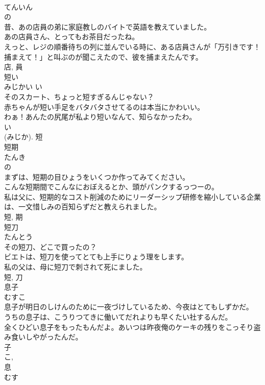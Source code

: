 \documentclass[8pt]{extreport}
\begin{document}
\begin{CJK}{UTF8}{min}
\\	てんいん	
\\	の 
\\	昔、あの店員の弟に家庭教しのバイトで英語を教えていました。	
\\	あの店員さん、とってもお茶目だったね。	
\\	えっと、レジの順番待ちの列に並んでいる時に、ある店員さんが「万引きです！捕まえて！」と叫ぶのが聞こえたので、彼を捕まえたんです。	
\\	店, 員	
\\	短い	
\\	みじかい	い 
\\	そのスカート、ちょっと短すぎるんじゃない？	
\\	赤ちゃんが短い手足をバタバタさせてるのは本当にかわいい。	
\\	わぁ！あんたの尻尾が私より短いなんて、知らなかったわ。	
\\	い 
\\	(みじか).	短	
\\	短期	
\\	たんき	
\\	の 
\\	まずは、短期の目ひょうをいくつか作ってみてください。	
\\	こんな短期間でこんなにおぼえるとか、頭がパンクするっつーの。	
\\	私は父に、短期的なコスト削減のためにリーダーシップ研修を縮小している企業は、一文惜しみの百知らずだと教えられました。	
\\	短, 期	
\\	短刀	
\\	たんとう	
\\	その短刀、どこで買ったの？	
\\	ビエトは、短刀を使ってとても上手にりょう理をします。	
\\	私の父は、母に短刀で刺されて死にました。	
\\	短, 刀	
\\	息子	
\\	むすこ	
\\	息子が明日のしけんのために一夜づけしているため、今夜はとてもしずかだ。	
\\	うちの息子は、こうりつてきに働いてだれよりも早くたい社するんだ。	
\\	全くひどい息子をもったもんだよ。あいつは昨夜俺のケーキの残りをこっそり盗み食いしやがったんだ。	
\\	子 
\\	こ, 
\\	息 
\\	むす 

\end{CJK}
\end{document}
